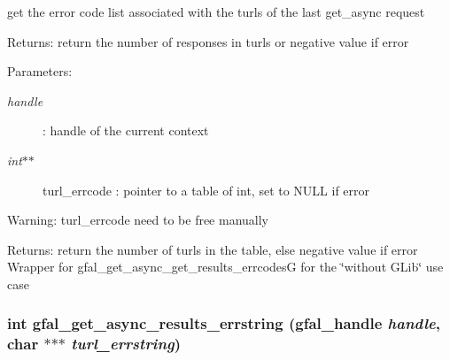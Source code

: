 get the error code list associated with the turls of the last get\_\-async request \begin{Desc}
\item[Returns:]return the number of responses in turls or negative value if error \end{Desc}
\begin{Desc}
\item[Parameters:]
\begin{description}
\item[{\em handle}]: handle of the current context \item[{\em int$\ast$$\ast$}]turl\_\-errcode : pointer to a table of int, set to NULL if error \end{description}
\end{Desc}
\begin{Desc}
\item[Warning:]turl\_\-errcode need to be free manually \end{Desc}
\begin{Desc}
\item[Returns:]return the number of turls in the table, else negative value if error Wrapper for gfal\_\-get\_\-async\_\-get\_\-results\_\-errcodes\-G for the \char`\"{}without GLib\char`\"{} use case \end{Desc}
\subsubsection{\setlength{\rightskip}{0pt plus 5cm}int gfal\_\-get\_\-async\_\-results\_\-errstring (gfal\_\-handle {\em handle}, char $\ast$$\ast$$\ast$ {\em turl\_\-errstring})}\label{gfal__common__interface_8c_c2d58855fe41370b710effc515e53370}



